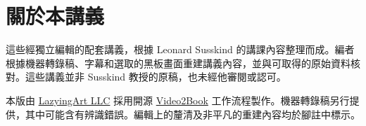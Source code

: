 \documentclass[11pt,oneside]{book}
\begin{document}
\frontmatter
\hypersetup{pageanchor=false}

\hypersetup{pageanchor=true}

\clearpage
\chapter*{關於本講義}
這些經獨立編輯的配套講義，根據 Leonard Susskind 的講課內容整理而成。編者根據機器轉錄稿、字幕和選取的黑板畫面重建講義內容，並與可取得的原始資料核對。這些講義並非 Susskind 教授的原稿，也未經他審閱或認可。

本版由 \href{https://lazying.art}{LazyingArt LLC} 採用開源 \href{https://github.com/lachlanchen/Video2Book}{Video2Book} 工作流程製作。機器轉錄稿另行提供，其中可能含有辨識錯誤。編輯上的釐清及非平凡的重建內容均於腳註中標示。
\clearpage
\tableofcontents
\mainmatter










\end{document}
